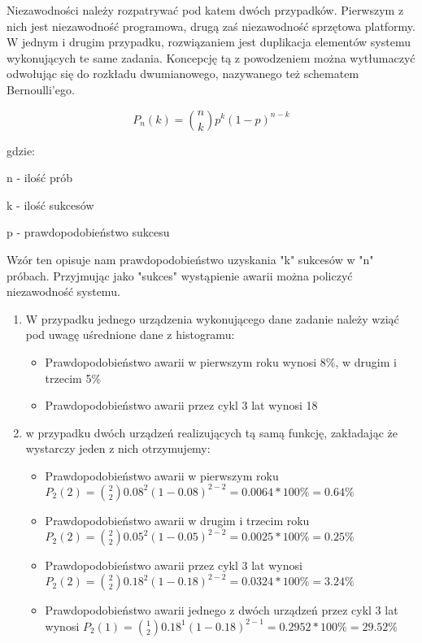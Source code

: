 				\par Niezawodności należy rozpatrywać pod katem dwóch przypadków. Pierwszym z nich jest niezawodność programowa, drugą zaś niezawodność sprzętowa platformy. W jednym i drugim przypadku, rozwiązaniem jest duplikacja elementów systemu wykonujących te same zadania. Koncepcję tą z powodzeniem można wytłumaczyć odwołując się do rozkładu dwumianowego, nazywanego też schematem Bernoulli'ego.
				
				\[ P_n(k) = \binom{n}{k} p^k (1-p)^{n-k} \]
			
				gdzie:
			
				\begin{description}
					\item n - ilość prób 
					\item k - ilość sukcesów 
					\item p - prawdopodobieństwo sukcesu
				\end{description}
				
				Wzór ten opisuje nam prawdopodobieństwo uzyskania "k" sukcesów w "n" próbach. Przyjmując jako "sukces" wystąpienie awarii można policzyć niezawodność systemu. 
			
				\begin{enumerate}
					\item W przypadku jednego urządzenia wykonującego dane zadanie należy wziąć pod uwagę uśrednione dane z histogramu:
							\begin{itemize}
								\item Prawdopodobieństwo awarii w pierwszym roku wynosi 8\%, w drugim i trzecim 5\%
								\item Prawdopodobieństwo awarii przez cykl 3 lat wynosi 18%
							\end{itemize}
					\item w przypadku dwóch urządzeń realizujących tą samą funkcję, zakładając że wystarczy jeden z nich otrzymujemy:
							\begin{itemize}
								\item Prawdopodobieństwo awarii w pierwszym roku \( P_2(2) = \binom{2}{2} 0.08^2 (1-0.08)^{2-2} = 0.0064*100\% = 0.64\%\)
								\item Prawdopodobieństwo awarii w drugim i trzecim roku \( P_2(2) = \binom{2}{2} 0.05^2 (1-0.05)^{2-2} = 0.0025*100\% = 0.25\%\)
								\item Prawdopodobieństwo awarii przez cykl 3 lat wynosi \( P_2(2) = \binom{2}{2} 0.18^2 (1-0.18)^{2-2} = 0.0324*100\% = 3.24\%\)
								\item Prawdopodobieństwo awarii jednego z dwóch urządzeń przez cykl 3 lat wynosi \( P_2(1) = \binom{1}{2} 0.18^1 (1-0.18)^{2-1} = 0.2952*100\% = 29.52\%\)
							\end{itemize}
				\end{enumerate}
				
